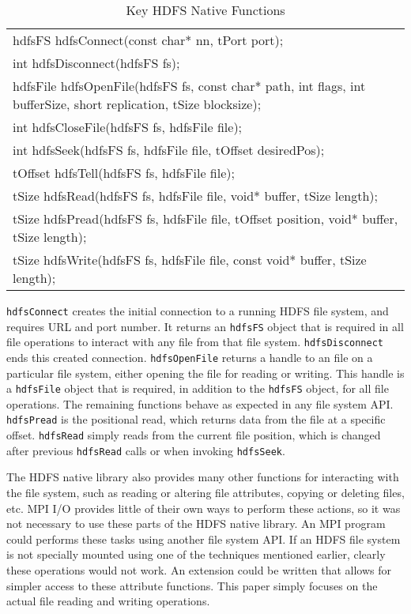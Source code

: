 \begin{table}[ht]
\caption{Key HDFS Native Functions}
{\ttfamily
\begin{tabular}{l}
\hline\hline
hdfsFS hdfsConnect(const char* nn, tPort port); \\
int hdfsDisconnect(hdfsFS fs); \\
hdfsFile hdfsOpenFile(hdfsFS fs, const char* path, int flags,
                          int bufferSize, short replication, tSize blocksize); \\
int hdfsCloseFile(hdfsFS fs, hdfsFile file); \\
int hdfsSeek(hdfsFS fs, hdfsFile file, tOffset desiredPos); \\
tOffset hdfsTell(hdfsFS fs, hdfsFile file); \\
tSize hdfsRead(hdfsFS fs, hdfsFile file, void* buffer, tSize length); \\
tSize hdfsPread(hdfsFS fs, hdfsFile file, tOffset position,
                    void* buffer, tSize length); \\
tSize hdfsWrite(hdfsFS fs, hdfsFile file, const void* buffer,
                    tSize length); \\
\hline\hline
\end{tabular}
}
\label{table:libhdfs}
\end{table}
					
\texttt{hdfsConnect} creates the initial connection to a running HDFS file system, and requires URL and port number. It returns an \texttt{hdfsFS} object that is required in all file operations to interact with any file from that file system. \texttt{hdfsDisconnect} ends this created connection. \texttt{hdfsOpenFile} returns a handle to an file on a particular file system, either opening the file for reading or writing. This handle is a \texttt{hdfsFile} object that is required, in addition to the \texttt{hdfsFS} object, for all file operations. The remaining functions behave as expected in any file system API. \texttt{hdfsPread} is the positional read, which returns data from the file at a specific offset. \texttt{hdfsRead} simply reads from the current file position, which is changed after previous \texttt{hdfsRead} calls or when invoking \texttt{hdfsSeek}.

The HDFS native library also provides many other functions for interacting with the file system, such as reading or altering file attributes, copying or deleting files, etc. MPI I/O provides little of their own ways to perform these actions, so it was not necessary to use these parts of the HDFS native library. An MPI program could performs these tasks using another file system API. If an HDFS file system is not specially mounted using one of the techniques mentioned earlier, clearly these operations would not work. An extension could be written that allows for simpler access to these attribute functions. This paper simply focuses on the actual file reading and writing operations.


